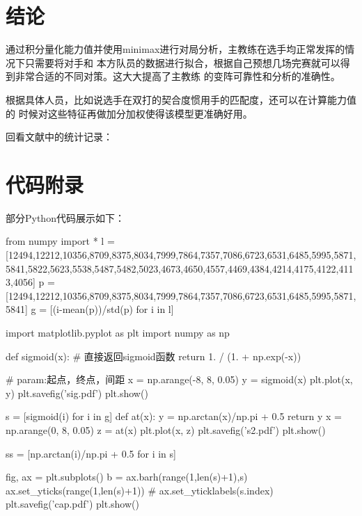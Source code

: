 \documentclass[a4paper,AutoFakeBold,AutoFakeSlant]{ctexart}
\begin{document}
\section{结论}
通过积分量化能力值并使用minimax进行对局分析，主教练在选手均正常发挥的情况下只需要将对手和
本方队员的数据进行拟合，根据自己预想几场完赛就可以得到非常合适的不同对策。这大大提高了主教练
的变阵可靠性和分析的准确性。

根据具体人员，比如说选手在双打的契合度惯用手的匹配度，还可以在计算能力值的
时候对这些特征再做加分加权使得该模型更准确好用。

回看文献中的统计记录\cite{张瑛秋2019东京奥运会乒乓球团体赛制改革背景下中国队夺金策略}：







\section*{代码附录}
部分Python代码展示如下：
\begin{python}
from numpy import *
l = [12494,12212,10356,8709,8375,8034,7999,7864,7357,7086,6723,6531,6485,5995,5871,5841,5822,5623,5538,5487,5482,5023,4673,4650,4557,4469,4384,4214,4175,4122,4113,4056]
p = [12494,12212,10356,8709,8375,8034,7999,7864,7357,7086,6723,6531,6485,5995,5871,5841]
g = [(i-mean(p))/std(p) for i in l]


import matplotlib.pyplot as plt
import numpy as np
  
def sigmoid(x):
    # 直接返回sigmoid函数
    return 1. / (1. + np.exp(-x))
  
# param:起点，终点，间距
x = np.arange(-8, 8, 0.05)
y = sigmoid(x)
plt.plot(x, y)
plt.savefig('sig.pdf')
plt.show()

s = [sigmoid(i) for i in g]
def at(x):
    y = np.arctan(x)/np.pi + 0.5
    return y
x = np.arange(0, 8, 0.05)
z = at(x)
plt.plot(x, z)
plt.savefig('s2.pdf')
plt.show()

ss = [np.arctan(i)/np.pi + 0.5 for i in s]

fig, ax = plt.subplots()
b = ax.barh(range(1,len(s)+1),s)
ax.set_yticks(range(1,len(s)+1))
# ax.set_yticklabels(s.index)
plt.savefig('cap.pdf')
plt.show()
\end{python}
\end{document}
